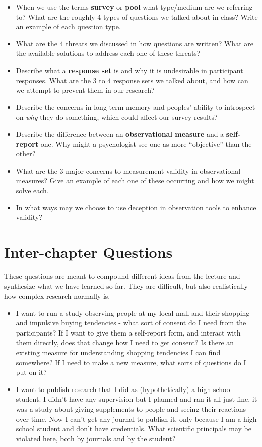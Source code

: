 \documentclass[
  12pt,
  letterpaper,
]{scrartcl}
\begin{document}
\begin{itemize}
\item
  When we use the terms \textbf{survey} or \textbf{pool} what
  type/medium are we referring to? What are the roughly 4 types of
  questions we talked about in class? Write an example of each question
  type.
\item
  What are the 4 threats we discussed in how questions are written? What
  are the available solutions to address each one of these threats?
\item
  Describe what a \textbf{response set} is and why it is undesirable in
  participant responses. What are the 3 to 4 response sets we talked
  about, and how can we attempt to prevent them in our research?
\item
  Describe the concerns in long-term memory and peoples' ability to
  introspect on \emph{why} they do something, which could affect our
  survey results?
\item
  Describe the difference between an \textbf{observational measure} and
  a \textbf{self-report} one. Why might a psychologist see one as more
  ``objective'' than the other?
\item
  What are the 3 major concerns to measurement validity in observational
  measures? Give an example of each one of these occurring and how we
  might solve each.
\item
  In what ways may we choose to use deception in observation tools to
  enhance validity?
\end{itemize}

\section{Inter-chapter Questions}\label{sec-inter-chapter}

These questions are meant to compound different ideas from the lecture
and synthesize what we have learned so far. They are difficult, but also
realistically how complex research normally is.

\begin{itemize}
\item
  I want to run a study observing people at my local mall and their
  shopping and impulsive buying tendencies - what sort of consent do I
  need from the participants? If I want to give them a self-report form,
  and interact with them directly, does that change how I need to get
  consent? Is there an existing measure for understanding shopping
  tendencies I can find somewhere? If I need to make a new measure, what
  sorts of questions do I put on it?
\item
  I want to publish research that I did as (hypothetically) a
  high-school student. I didn't have any supervision but I planned and
  ran it all just fine, it was a study about giving supplements to
  people and seeing their reactions over time. Now I can't get any
  journal to publish it, only because I am a high school student and
  don't have credentials. What scientific principals may be violated
  here, both by journals and by the student?
\end{itemize}
\end{document}
